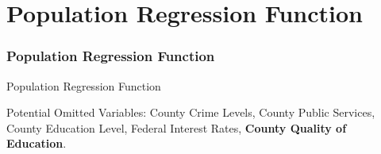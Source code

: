 \documentclass{beamer}
\begin{document}
\section{Population Regression Function}
\begin{frame}
\frametitle{Population Regression Function}
\pause
\begin{block}{Population Regression Function}
\end{block}

\pause
Potential Omitted Variables: County Crime Levels, County Public Services, County Education Level, Federal Interest Rates, \textbf{County Quality of Education}.

\end{frame}
\end{document}
